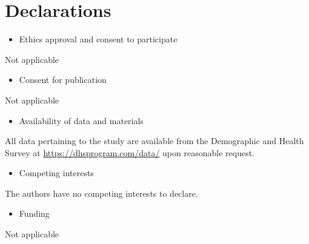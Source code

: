 \documentclass[sn-basic,Numbered,pdflatex]{sn-jnl}
\theoremstyle{remark}
\theoremstyle{definition}
\providecommand{\tightlist}{%
  \setlength{\itemsep}{0pt}\setlength{\parskip}{0pt}}
\begin{document}
\backmatter

\hypertarget{declarations}{%
\section*{Declarations}\label{declarations}}

\begin{itemize}
\tightlist
\item
  Ethics approval and consent to participate
\end{itemize}

Not applicable

\begin{itemize}
\tightlist
\item
  Consent for publication
\end{itemize}

Not applicable

\begin{itemize}
\tightlist
\item
  Availability of data and materials
\end{itemize}

All data pertaining to the study are available from the Demographic and
Health Survey at \url{https://dhsprogram.com/data/} upon reasonable
request.

\begin{itemize}
\tightlist
\item
  Competing interests
\end{itemize}

The authors have no competing interests to declare.

\begin{itemize}
\tightlist
\item
  Funding
\end{itemize}

Not applicable


\end{document}
